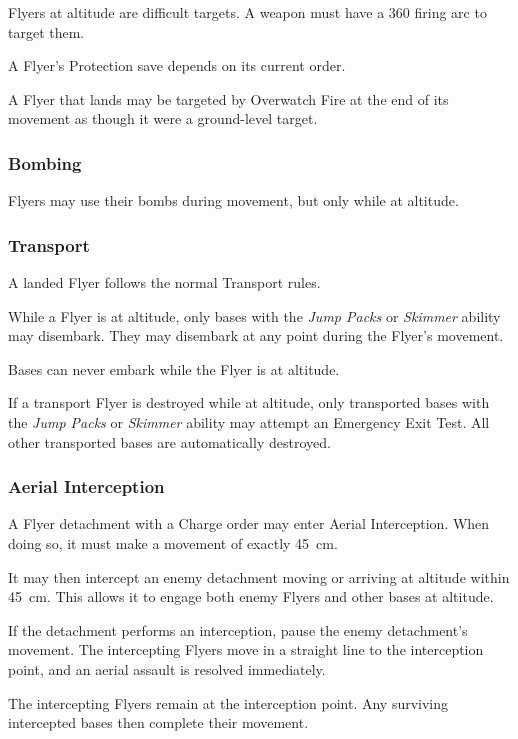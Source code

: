 Flyers at altitude are difficult targets. A weapon must have a 360\textdegree{} firing arc to target them.

A Flyer's Protection save depends on its current order.

A Flyer that lands may be targeted by Overwatch Fire at the end of its movement as though it were a ground-level target.

\subsubsection{Bombing}

Flyers may use their bombs during movement, but only while at altitude.

\subsubsection{Transport}

A landed Flyer follows the normal Transport rules.

While a Flyer is at altitude, only bases with the \textit{Jump Packs} or \textit{Skimmer} ability may disembark. They may disembark at any point during the Flyer's movement.

Bases can never embark while the Flyer is at altitude.

If a transport Flyer is destroyed while at altitude, only transported bases with the \textit{Jump Packs} or \textit{Skimmer} ability may attempt an Emergency Exit Test. All other transported bases are automatically destroyed.

\subsubsection{Aerial Interception}

A Flyer detachment with a Charge order may enter Aerial Interception. When doing so, it must make a movement of exactly 45~cm.

It may then intercept an enemy detachment moving or arriving at altitude within 45~cm. This allows it to engage both enemy Flyers and other bases at altitude.

If the detachment performs an interception, pause the enemy detachment's movement. The intercepting Flyers move in a straight line to the interception point, and an aerial assault is resolved immediately.

The intercepting Flyers remain at the interception point. Any surviving intercepted bases then complete their movement.

